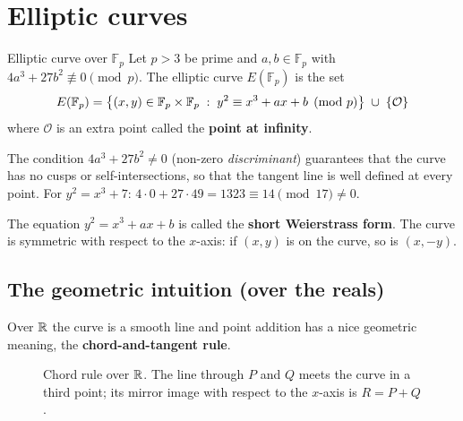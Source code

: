 
\section{Elliptic curves}

\begin{frameddefn}[label={def:ec}]{Elliptic curve over $\mathbb{F}_p$}
  Let $p > 3$ be prime and $a, b \in \mathbb{F}_p$ with $4a^3 + 27b^2 \not\equiv 0 \pmod p$. The elliptic curve $E(\mathbb{F}_p)$ is the set
  \[
    E(\mathbb{F}_p) = \left\{(x,y) \in \mathbb{F}_p \times \mathbb{F}_p \;:\; y^2 \equiv x^3 + a x + b \pmod p\right\} \;\cup\; \left\{\mathcal{O}\right\}
  \]
  where $\mathcal{O}$ is an extra point called the \textbf{point at infinity}.
\end{frameddefn}

The condition $4a^3 + 27b^2 \neq 0$ (non-zero \textit{discriminant}) guarantees that the curve has no cusps or self-intersections, so that the tangent line is well defined at every point. For $y^2 = x^3 + 7$: $4 \cdot 0 + 27 \cdot 49 = 1323 \equiv 14 \pmod{17} \neq 0$. \checkmark

The equation $y^2 = x^3 + ax + b$ is called the \textbf{short Weierstrass form}. The curve is symmetric with respect to the $x$-axis: if $(x,y)$ is on the curve, so is $(x,-y)$.

\subsection{The geometric intuition (over the reals)}

Over $\mathbb{R}$ the curve is a smooth line and point addition has a nice geometric meaning, the \textbf{chord-and-tangent rule}.

\begin{figure}[H]
  \centering
  \caption{Chord rule over $\mathbb{R}$. The line through $P$ and $Q$ meets the curve in a third point; its mirror image with respect to the $x$-axis is $R = P + Q$.}
  \label{fig:chord}
\end{figure}

